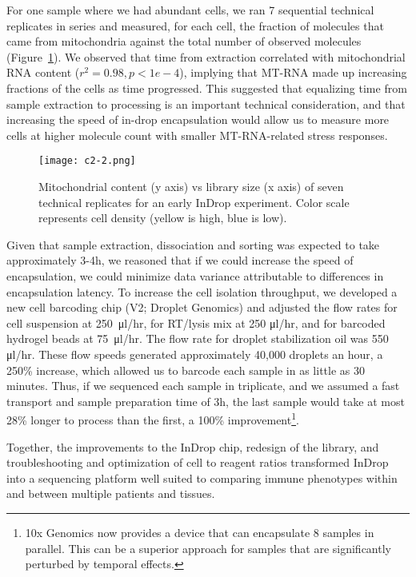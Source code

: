 For one sample where we had abundant cells, we ran 7 sequential technical replicates in series and measured, for each cell, the fraction of molecules that came from mitochondria against the total number of observed molecules (Figure~\ref{fig:c2-2}).
We observed that time from extraction correlated with mitochondrial RNA content ($r^2 = 0.98, p < 1e-4$), implying that MT-RNA made up increasing fractions of the cells as time progressed. 
This suggested that equalizing time from sample extraction to processing is an important technical consideration, and that increasing the speed of in-drop encapsulation would allow us to measure more cells at higher molecule count with smaller MT-RNA-related stress responses. 

\begin{figure} 
\centering
\texttt{[image: c2-2.png]}
\caption{Mitochondrial content (y axis) vs library size (x axis) of seven technical replicates for an early InDrop experiment. Color scale represents cell density (yellow is high, blue is low).}
\label{fig:c2-2}
\end{figure}

Given that sample extraction, dissociation and sorting was expected to take approximately 3-4h, we reasoned that if we could increase the speed of encapsulation, we could minimize data variance attributable to differences in encapsulation latency.  
To increase the cell isolation throughput, we developed a new cell barcoding chip (V2; Droplet Genomics) and adjusted the flow rates for cell suspension at 250~μl/hr, for RT/lysis mix at 250 μl/hr, and for barcoded hydrogel beads at 75~μl/hr. 
The flow rate for droplet stabilization oil was 550 μl/hr.
These flow speeds generated approximately 40,000 droplets an hour, a 250\% increase, which allowed us to barcode each sample in as little as 30 minutes. 
Thus, if we sequenced each sample in triplicate, and we assumed a fast transport and sample preparation time of 3h, the last sample would take at most 28\% longer to process than the first, a 100\% improvement\footnote{10x Genomics now provides a device that can encapsulate 8 samples in parallel. This can be a superior approach for samples that are significantly perturbed by temporal effects.}.

Together, the improvements to the InDrop chip, redesign of the library, and troubleshooting and optimization of cell to reagent ratios transformed InDrop into a sequencing platform well suited to comparing immune phenotypes within and between multiple patients and tissues. 

